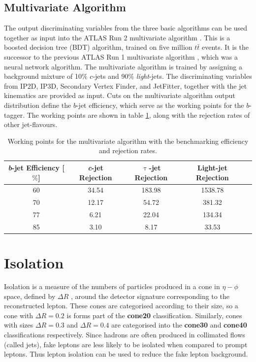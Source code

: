 \subsection{Multivariate Algorithm}
\label{mva}
The output discriminating variables from the three basic algorithms can be used together as input into the ATLAS Run 2 multivariate algorithm \cite{b-tagging_ref}. This is a boosted decision tree (BDT) algorithm, trained on five million $t\bar{t}$ events. It is the successor to the previous ATLAS Run 1 multivariate algorithm \cite{MV1}, which was a neural network algorithm. The multivariate algorithm is trained by assigning a background mixture of 10$\%$ $c$-jets and 90$\%$ \emph{light}-jets. The discriminating variables from IP2D, IP3D, Secondary Vertex Finder, and JetFitter, together with the jet kinematics are provided as input. Cuts on the multivariate algorithm output distribution define the $b$-jet efficiency, which serve as the working points for the $b$-tagger. The working points are shown in table \ref{b-tagger_working_points}, along with the rejection rates of other jet-flavours.
\begin{table}
	\begin{tabular}{|c|c|c|c|c|}
	\hline
	 \emph{b}-jet Efficiency [$\%$] & \emph{c}-jet Rejection & $\uptau$-jet Rejection & Light-jet Rejection \\ \hline
	60 & 34.54 & 183.98 & 1538.78 \\
	70 & 12.17 & 54.72 & 381.32 \\
	77 & 6.21 & 22.04 & 134.34 \\
	85 & 3.10 & 8.17 & 33.53 \\ \hline
	\end{tabular}
	\caption{Working points for the multivariate algorithm with the benchmarking efficiency and rejection rates. \cite{b-tagging_ref}}
	\label{b-tagger_working_points}
\end{table}
\section{Isolation}
\label{isolation_section}
Isolation is a measure of the numbers of particles produced in a cone in $\eta - \phi$ space, defined by $\Delta R$ , around the detector signature corresponding to the reconstructed lepton. These cones are categorised according to their size, so a cone with $\Delta R = 0.2$ is forms part of the \textbf{cone20} classification. Similarly, cones with sizes $\Delta R=0.3$ and $\Delta R =0.4$ are categorised into the \textbf{cone30} and \textbf{cone40} classifications respectively. Since hadrons are often produced in collimated flows (called jets), fake leptons are less likely to be isolated when compared to prompt leptons. Thus lepton isolation can be used to reduce the fake lepton background.

